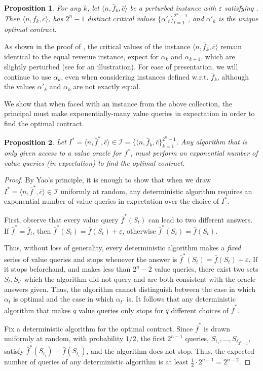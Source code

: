 \documentclass[11pt]{article}
\newtheorem{proposition}{Proposition}
\newcommand{\eps}{\varepsilon}
\newcommand{\I}{\mathcal{I}}
\newcommand{\feq}{\bar{f}}
\newcommand{\ceq}{\bar{c}}
\newcommand{\perturbedInst}{\langle n,\feq_k,\ceq \rangle}
\begin{document}
\begin{proposition}\label{prop:feq_k_CVs}
    For any $k$, let $\langle n, \feq_k, \ceq \rangle$ be a perturbed instance with $\eps$ satisfying .
    Then $\langle n, \feq_k, \ceq \rangle$, has $2^n-1$ distinct critical values $\{\alpha'_t\}_{t=1}^{2^n-1}$, and $\alpha'_k$ is the unique optimal contract.
\end{proposition}

As shown in the proof of , the critical values of the instance $\perturbedInst$ remain identical to the equal revenue instance, expect for $\alpha_k$ and $\alpha_{k+1}$, which are slightly perturbed (see  for an illustration).
For ease of presentation, we will continue to use $\alpha_k$, even when considering instances defined w.r.t. $\feq_k$, although the values $\alpha'_k $ and $\alpha_k$ are not exactly equal.

We show that when faced with an instance from the above collection, the principal must make exponentially-many value queries in expectation in order to find the optimal contract. 

\begin{proposition}\label{prop:valueQueryBound}
Let $I^* = \langle n, \feq^*, \ceq \rangle \in \I = \{\langle n, \feq_k, \ceq \}_{k=1}^{2^n-1}$.
Any algorithm that is only given access to a value oracle for $f^*$, must perform an exponential number of value queries (in expectation) to find the optimal contract.
\end{proposition}
\begin{proof}
    By Yao's principle, it is enough to show that when we draw $I^* =\langle n, \feq^*, \ceq \rangle \in \I$ uniformly at random, any deterministic algorithm requires an exponential number of value queries in expectation over the choice of $I^*$.

    First, observe that every value query $\feq^*(S_t)$ can lead to two different answers. If $\feq^* = \feq_{t}$, then $\feq^*(S_t) = \feq(S_t) + \eps$, otherwise $\feq^*(S_t) = \feq(S_t)$.
    
    Thus, without loss of generality, every deterministic algorithm makes a \emph{fixed} series of value queries and stops whenever the answer is $\feq^*(S_t) = \feq(S_t) + \eps$. If it stops beforehand, and makes less than $2^n-2$ value queries, there exist two sets $S_t,S_{t'}$ which the algorithm did not query and are both consistent with the oracle answers given. Thus, the algorithm cannot distinguish between the case in which $\alpha_t$ is optimal and the case in which $\alpha_{t'}$ is.
    It follows that any deterministic algorithm that makes $q$ value queries only stops for $q$ different choices of $\feq^*$. 
    
    Fix a deterministic algorithm for the optimal contract. Since $\feq^*$ is drawn uniformly at random, with probability $1/2$, the first $2^{n-1}$ queries, $S_{t_1},\ldots,S_{t_{2^{n}-1}}$, satisfy $\feq^*(S_{t_i}) = \feq(S_{t_i})$, and the algorithm does not stop.
    Thus, the expected number of queries of any deterministic algorithm is at least $\frac{1}{2} \cdot 2^{n-1} = 2^{n-2}$.
\end{proof}
\end{document}
